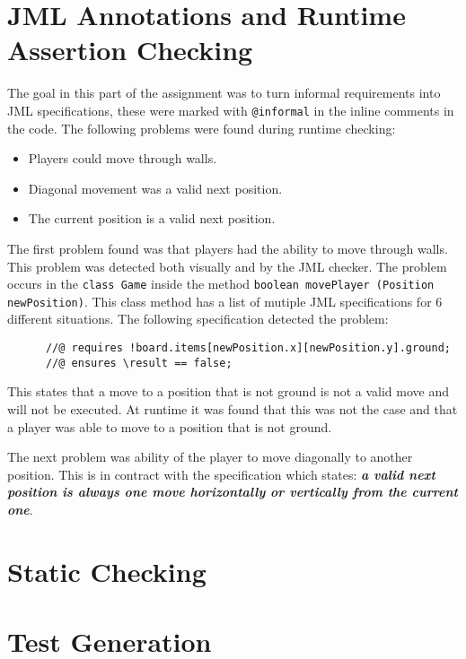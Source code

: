 \documentclass[a4paper]{article}
\begin{document}
\section{JML Annotations and Runtime Assertion Checking}
The goal in this part of the assignment was to turn informal requirements into JML specifications, these were marked with \texttt{@informal} in the inline comments in the code. \newline
The following problems were found during runtime checking:
\begin{itemize}
	\item Players could move through walls.
	\item Diagonal movement was a valid next position.
	\item The current position is a valid next position.
\end{itemize}
The first problem found was that players had the ability to move through walls. This problem was detected both visually and by the JML checker. The problem occurs in the \texttt{class Game} inside the method \texttt{boolean movePlayer (Position newPosition)}. This class method has a list of mutiple JML specifications for 6 different situations. The following specification detected the problem:
\begin{lstlisting}
	  //@ requires !board.items[newPosition.x][newPosition.y].ground;
	  //@ ensures \result == false;
\end{lstlisting}
This states that a move to a position that is not ground is not a valid move and will not be executed. At runtime it was found that this was not the case and that a player was able to move to a position that is not ground.

The next problem was ability of the player to move diagonally to another position. This is in contract with the specification which states: \textbf{\textit{a valid next position is always one move horizontally or vertically from the current one}}.

\section{Static Checking}


\section{Test Generation}
\end{document}
